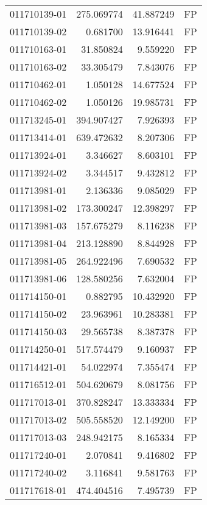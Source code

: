 \begin{tabular}{lrrl}
011710139-01 &  275.069774 &      41.887249 &   FP \\
011710139-02 &    0.681700 &      13.916441 &   FP \\
011710163-01 &   31.850824 &       9.559220 &   FP \\
011710163-02 &   33.305479 &       7.843076 &   FP \\
011710462-01 &    1.050128 &      14.677524 &   FP \\
011710462-02 &    1.050126 &      19.985731 &   FP \\
011713245-01 &  394.907427 &       7.926393 &   FP \\
011713414-01 &  639.472632 &       8.207306 &   FP \\
011713924-01 &    3.346627 &       8.603101 &   FP \\
011713924-02 &    3.344517 &       9.432812 &   FP \\
011713981-01 &    2.136336 &       9.085029 &   FP \\
011713981-02 &  173.300247 &      12.398297 &   FP \\
011713981-03 &  157.675279 &       8.116238 &   FP \\
011713981-04 &  213.128890 &       8.844928 &   FP \\
011713981-05 &  264.922496 &       7.690532 &   FP \\
011713981-06 &  128.580256 &       7.632004 &   FP \\
011714150-01 &    0.882795 &      10.432920 &   FP \\
011714150-02 &   23.963961 &      10.283381 &   FP \\
011714150-03 &   29.565738 &       8.387378 &   FP \\
011714250-01 &  517.574479 &       9.160937 &   FP \\
011714421-01 &   54.022974 &       7.355474 &   FP \\
011716512-01 &  504.620679 &       8.081756 &   FP \\
011717013-01 &  370.828247 &      13.333334 &   FP \\
011717013-02 &  505.558520 &      12.149200 &   FP \\
011717013-03 &  248.942175 &       8.165334 &   FP \\
011717240-01 &    2.070841 &       9.416802 &   FP \\
011717240-02 &    3.116841 &       9.581763 &   FP \\
011717618-01 &  474.404516 &       7.495739 &   FP \\

\end{tabular}
